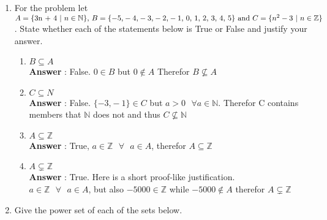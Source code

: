 \documentclass[a4paper,11pt]{article}
\begin{document}
\begin{enumerate}
\begin{enumerate}
  \end{enumerate}
  \newpage
\item For the problem let \( 
A = \lbrace $3n + 4$ \text{ }\vert\text{ }  n \in \mathbb{N} \rbrace \text{, } 
B =  \lbrace -5 \text{,} -4 \text{,} -3 \text{,} -2 \text{,} -1 \text{, } 0 \text{, } 1 \text{, } 2 \text{, } 3 \text{, } 4 \text{, } 5  \rbrace \text{ and } 
C = \lbrace n^2 - 3 \text{ }\vert \text{ }  n \in \mathbb{Z} \rbrace\). State whether each of the statements below is True or False and justify your answer.
  
  \begin{enumerate}
  \item $B \subseteq A$ \\
  \textbf{Answer} : False. $0 \in B$ but $0 \not\in A$ Therefor $B \not\subseteq A$

  \item $C \subseteq N$ \\
  \textbf{Answer} : False. $\lbrace -3 \text{,} -1 \rbrace \in C$ but  $a > 0\text{ } \forall a \in \mathbb{N}$. Therefor C contains members that $\mathbb{N}$ does not and thus  $C \not\subseteq \mathbb{N}$

  \item $A \subseteq \mathbb{Z}$ \\
  \textbf{Answer} : True, $a \in \mathbb{Z} \text{ } \forall \text{ } a \in A$, therefor $A \subseteq \mathbb{Z}$

  \item $A \subsetneq \mathbb{Z}$ \\
  \textbf{Answer} : True. Here is a short proof-like justification. \\
   $a \in \mathbb{Z} \text{ } \forall \text{ } a \in A$, but also $-5000 \in \mathbb{Z}$ while $-5000 \not\in A$  therefor $A \subsetneq \mathbb{Z}$

  \end{enumerate}

\item Give the power set of each of the sets below.


\end{enumerate}
\end{document}
